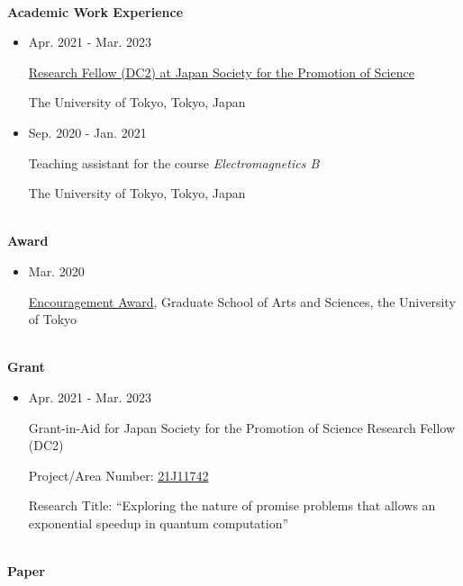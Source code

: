 \documentclass[dvipdfmx]{jsarticle}
\begin{document}
%
%
%
%
{\ }\\
\vspace{3mm}
{\bf\large Academic Work Experience}
\vspace{-6mm}
\\\hrulefill
\begin{itemize}
\item
Apr. 2021 - Mar. 2023
\par
\href{https://www.jsps.go.jp/english/e-pd/}{Research Fellow (DC2) at Japan Society for the Promotion of Science}
\par
The University of Tokyo, Tokyo, Japan
%
%
\item
Sep. 2020 - Jan. 2021
\par
Teaching assistant for the course \textit{Electromagnetics B}
\par
The University of Tokyo, Tokyo, Japan
\end{itemize}
%
%
%
%
\newpage
{\ }\\
\vspace{3mm}
{\bf\large Award}
\vspace{-6mm}
\\\hrulefill
\begin{itemize}
\item
Mar. 2020
\par
\href{http://www.dbs.c.u-tokyo.ac.jp/education/awards.html}{Encouragement Award}, Graduate School of Arts and Sciences, the University of Tokyo
\end{itemize}
%
%
%
%
{\ }\\
\vspace{3mm}
{\bf\large Grant}
\vspace{-6mm}
\\\hrulefill
\begin{itemize}
\item
Apr. 2021 - Mar. 2023
\par
Grant-in-Aid for Japan Society for the Promotion of Science Research Fellow (DC2)
\par
Project/Area Number: \href{https://kaken.nii.ac.jp/en/grant/KAKENHI-PROJECT-21J11742/}{21J11742}
\par
Research Title: ``Exploring the nature of promise problems that allows an exponential speedup in quantum computation''
\end{itemize}
%
%
%
%
{\ }\\
\vspace{3mm}
{\bf\large Paper}
\vspace{-6mm}
\\\hrulefill
\end{document}
